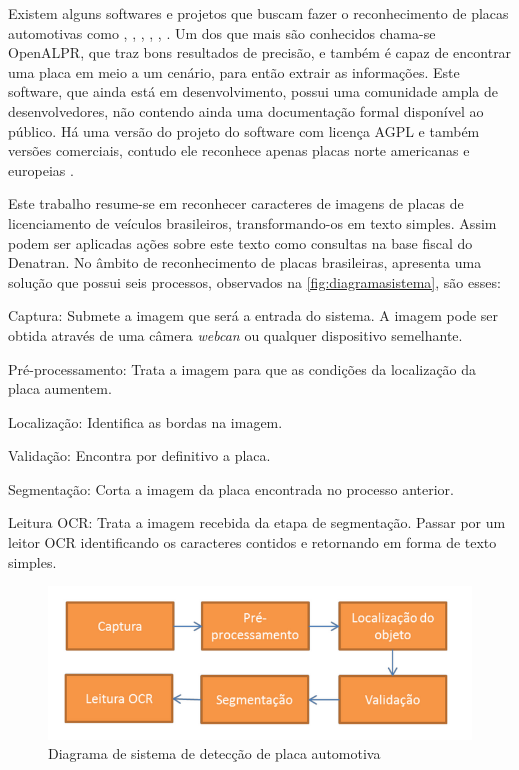 Existem alguns softwares e projetos que buscam fazer o reconhecimento de placas automotivas como \cite{openalpr}, \cite{licenseplaterecognition}, \cite{GOCR}, \cite{chang2004automatic}, \cite{hegt1998high}, \cite{nijhuis1995car}. Um dos que mais são conhecidos chama-se OpenALPR, que traz bons resultados de precisão, e também é capaz de encontrar uma placa em meio a um cenário, para então extrair as informações. Este software, que ainda está em desenvolvimento, possui uma comunidade ampla de desenvolvedores, não contendo ainda uma documentação formal disponível ao público. Há uma versão do projeto do software com licença AGPL e também versões comerciais, contudo ele reconhece apenas placas norte americanas e europeias \cite{openalpr}.

Este trabalho resume-se em reconhecer caracteres de imagens de placas de licenciamento de veículos brasileiros, transformando-os em texto simples. Assim podem ser aplicadas ações sobre este texto como consultas na base fiscal do Denatran. No âmbito de reconhecimento de placas brasileiras,  apresenta uma solução que possui seis processos, observados na \autoref{fig:diagramasistema}, são esses:

\begin{alineas}
\item Captura: Submete a imagem que será a entrada do sistema. A imagem pode ser obtida através de uma câmera \textit{webcan} ou qualquer dispositivo semelhante. 
\item Pré-processamento: Trata a imagem para que as condições da localização da placa aumentem.
\item Localização: Identifica as bordas na imagem.
\item Validação: Encontra por definitivo a placa.
\item Segmentação: Corta a imagem da placa encontrada no processo anterior.
\item Leitura OCR: Trata a imagem recebida da etapa de segmentação. Passar por um leitor OCR identificando os caracteres contidos e retornando em forma de texto simples. 
\end{alineas}

\begin{figure}[htbp]
\caption{\label{fig:diagramasistema}Diagrama de sistema de detecção de placa automotiva}
\begin{center}
\includegraphics[width=.9\textwidth]{figuras/f1c1.png}
\end{center}
\end{figure}


